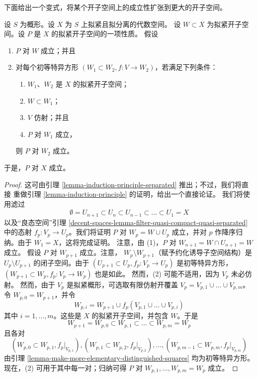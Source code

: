 \noindent
下面给出一个变式，将某个开子空间上的成立性扩张到更大的开子空间。

\begin{lemma}
\label{lemma-induction-principle-enlarge}
设 $S$ 为概形。设 $X$ 为 $S$ 上拟紧且拟分离的代数空间。
设 $W \subset X$ 为拟紧开子空间。设 $P$ 是 $X$ 的拟紧开子空间的一项性质。
假设
\begin{enumerate}
\item $P$ 对 $W$ 成立；并且
\item 对每个初等特异方形
$(W_1 \subset W_2, f : V \to W_2)$，若满足下列条件： %
\begin{enumerate}
\item $W_1$、$W_2$ 是 $X$ 的拟紧开子空间；
\item $W \subset W_1$；
\item $V$ 仿射；并且
\item $P$ 对 $W_1$ 成立，
\end{enumerate}
则 $P$ 对 $W_2$ 成立。
\end{enumerate}
于是，$P$ 对 $X$ 成立。
\end{lemma}

\begin{proof}
这可由引理 \ref{lemma-induction-principle-separated} 推出；不过，我们将直接
重做引理 \ref{lemma-induction-principle} 的证明，给出一个直接论证。
我们将使用滤过
$$
\emptyset = U_{n + 1} \subset
U_n \subset U_{n - 1} \subset \ldots \subset U_1 = X
$$
以及“良态空间”引理
\ref{decent-spaces-lemma-filter-quasi-compact-quasi-separated} 中的态射
$f_p : V_p \to U_p$。我们将证明 $P$ 对
$W_p = W \cup U_p$ 成立，并对 $p$ 作降序归纳。由于 $W_1 = X$，这将完成证明。
注意，由 (1)，$P$ 对 $W_{n + 1} = W \cap U_{n + 1} = W$ 成立。 %
假设 $P$ 对 $W_{p + 1}$ 成立。注意，
$W_p \setminus W_{p + 1}$（赋予约化诱导子空间结构）是
$U_p \setminus U_{p + 1}$ 的闭子空间。由于
$(U_{p + 1} \subset U_p, f_p : V_p \to U_p)$ 是初等特异方形，
$(W_{p + 1} \subset W_p, f_p : V_p \to W_p)$ 也是如此。
然而，(2) 可能不适用，因为 $V_p$ 未必仿射。
然而，由于 $V_p$ 是拟紧概形，可选取有限仿射开覆盖
$V_p = V_{p, 1} \cup \ldots \cup V_{p, m}$。令
$W_{p, 0} = W_{p + 1}$，并令
$$
W_{p, i} = W_{p + 1} \cup f_p(V_{p, 1} \cup \ldots \cup V_{p, i})
$$
其中 $i = 1, \ldots, m$。这些是 $X$ 的拟紧开子空间，并包含 $W$。于是
$$
W_{p + 1} = W_{p, 0} \subset
W_{p, 1} \subset \ldots \subset
W_{p, m} = W_p
$$
且各对
$$
(W_{p, 0} \subset W_{p, 1}, f_p|_{V_{p, 1}}),
(W_{p, 1} \subset W_{p, 2}, f_p|_{V_{p, 2}}),\ldots,
(W_{p, m - 1} \subset W_{p, m}, f_p|_{V_{p, m}})
$$
由引理 \ref{lemma-make-more-elementary-distinguished-squares}
均为初等特异方形。现在，(2) 可用于其中每一对；归纳可得 $P$ 对
$W_{p, 1}, \ldots, W_{p, m} = W_p$ 成立。
\end{proof}

